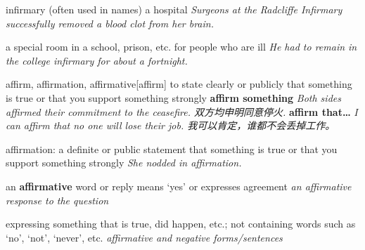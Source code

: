 \begin{DefWord}{infirmary}
    (often used in names) a hospital
    \textit{Surgeons at the Radcliffe Infirmary successfully removed a blood clot from her brain.}

    a special room in a school, prison, etc. for people who are ill
    \textit{He had to remain in the college infirmary for about a fortnight.}
\end{DefWord}

\begin{DefWord}{affirm, affirmation, affirmative}[affirm]
    to state clearly or publicly that something is true or that you support something strongly
    \textbf{affirm something} \textit{Both sides affirmed their commitment to the ceasefire. 双方均申明同意停火.}
    \textbf{affirm that…} \textit{I can affirm that no one will lose their job. 我可以肯定，谁都不会丢掉工作。}

    affirmation: a definite or public statement that something is true or that you support something strongly
    \textit{She nodded in affirmation.}

    an \textbf{affirmative} word or reply means ‘yes’ or expresses agreement
    \textit{an affirmative response to the question}

    expressing something that is true, did happen, etc.; not containing words such as ‘no’, ‘not’, ‘never’, etc.
    \textit{affirmative and negative forms/sentences}
\end{DefWord}

